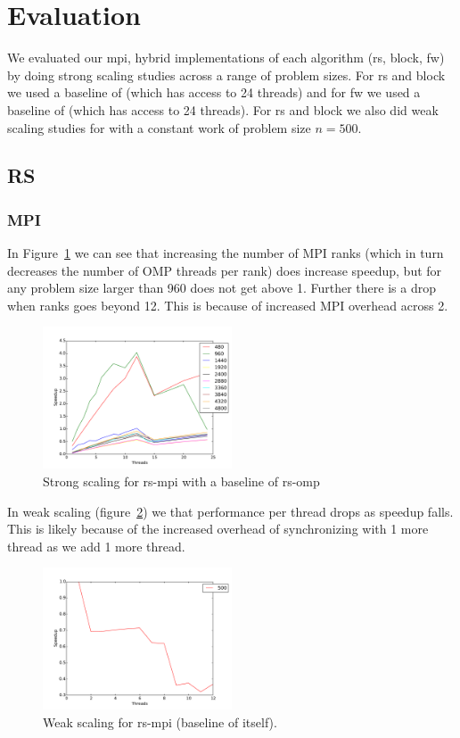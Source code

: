 \section{Evaluation}\label{sec:eval}

We evaluated our mpi, hybrid implementations of each algorithm (rs, block, fw)
by doing strong scaling studies across a range of problem sizes. For rs and
block we used a baseline of  (which has access to 24 threads) and for fw
we used a baseline of  (which has access to 24 threads). For rs and
block we also did weak scaling studies for with a constant work of problem size
$n=500$.

\subsection{RS}

\subsubsection{MPI}

In Figure~\ref{strong-rs-mpi} we can see that increasing the number of MPI ranks
(which in turn decreases the number of OMP threads per rank) does increase
speedup, but for any problem size larger than 960 does not get above 1. Further
there is a drop when ranks goes beyond 12. This is because of increased MPI
overhead across 2.

\begin{figure}[ht]
\centering
\includegraphics[width=0.5\textwidth]{plots/strong_rs-mpi_baseline-rs-omp--1.pdf}
\caption{Strong scaling for rs-mpi with a baseline of rs-omp}
\label{strong-rs-mpi}
\end{figure}

In weak scaling (figure~\ref{weak-rs-mpi}) we that performance per thread drops
as speedup falls. This is likely because of the increased overhead of
synchronizing with 1 more thread as we add 1 more thread.

\begin{figure}[ht]
\centering
\includegraphics[width=0.5\textwidth]{plots/weak_rs-mpi.pdf}
\caption{Weak scaling for rs-mpi (baseline of itself).}
\label{weak-rs-mpi}
\end{figure}

